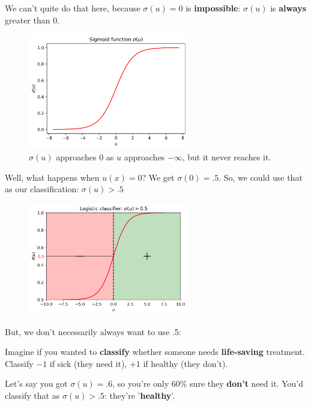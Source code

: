         We can't quite do that here, because $\sigma(u)=0$ is \textbf{impossible}: $\sigma(u)$ is \textbf{always} greater than 0.
        
        \begin{figure}[H]
            \centering
            
            \includegraphics[width=70mm,scale=0.5]{images/classification_images/sigmoid_u.png}
            
            \caption*{$\sigma(u)$ approaches 0 as $u$ approaches $-\infty$, but it never reaches it.}
        \end{figure}
        
        Well, what happens when $u(x)=0$? We get $\sigma(0)=.5$. So, we could use that as our classification: $\sigma(u)>.5$
        
        \begin{figure}[H]
            \centering
            
            \includegraphics[width=70mm,scale=0.5]{images/classification_images/sigmoid_.5.png}

        \end{figure}
        
        But, we don't necessarily always want to use .5:
        
        \miniex Imagine if you wanted to \textbf{classify} whether someone needs \textbf{life-saving} treatment. Classify $-1$ if sick (they need it), $+1$ if healthy (they don't). 
        
        Let's say you got $\sigma(u)=.6$, so you're only 60\% sure they \textbf{don't} need it. You'd classify that as $\sigma(u)>.5$: they're '\textbf{healthy}'.
        
